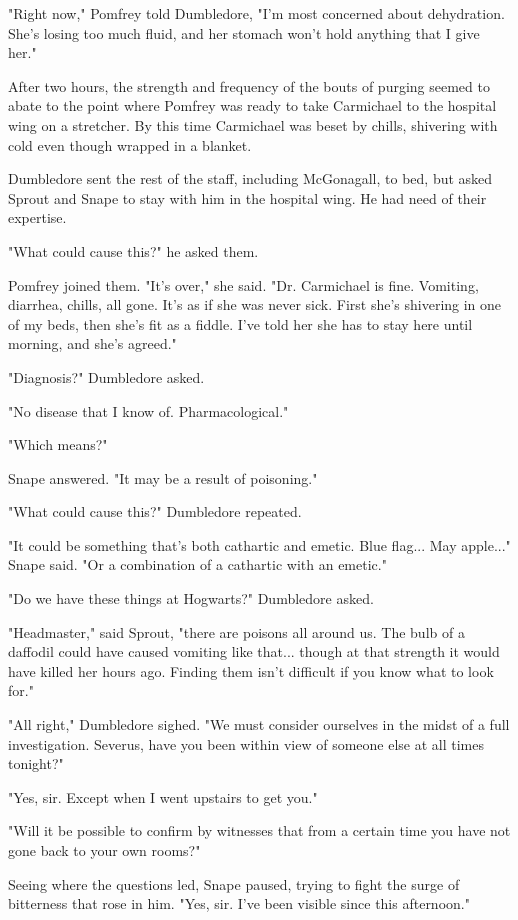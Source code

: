 \documentclass[a4paper,11pt]{article}
\begin{document}
"Right now," Pomfrey told Dumbledore, "I'm most concerned about dehydration. She's losing too much fluid, and her stomach won't hold anything that I give her."

After two hours, the strength and frequency of the bouts of purging seemed to abate to the point where Pomfrey was ready to take Carmichael to the hospital wing on a stretcher. By this time Carmichael was beset by chills, shivering with cold even though wrapped in a blanket.

Dumbledore sent the rest of the staff, including McGonagall, to bed, but asked Sprout and Snape to stay with him in the hospital wing. He had need of their expertise.

"What could cause this?" he asked them.

Pomfrey joined them. "It's over," she said. "Dr. Carmichael is fine. Vomiting, diarrhea, chills, all gone. It's as if she was never sick. First she's shivering in one of my beds, then she's fit as a fiddle. I've told her she has to stay here until morning, and she's agreed."

"Diagnosis?" Dumbledore asked.

"No disease that I know of. Pharmacological."

"Which means?"

Snape answered. "It may be a result of poisoning."

"What could cause this?" Dumbledore repeated.

"It could be something that's both cathartic and emetic. Blue flag... May apple..." Snape said. "Or a combination of a cathartic with an emetic."

"Do we have these things at Hogwarts?" Dumbledore asked.

"Headmaster," said Sprout, "there are poisons all around us. The bulb of a daffodil could have caused vomiting like that... though at that strength it would have killed her hours ago. Finding them isn't difficult if you know what to look for."

"All right," Dumbledore sighed. "We must consider ourselves in the midst of a full investigation. Severus, have you been within view of someone else at all times tonight?"

"Yes, sir. Except when I went upstairs to get you."

"Will it be possible to confirm by witnesses that from a certain time you have not gone back to your own rooms?"

Seeing where the questions led, Snape paused, trying to fight the surge of bitterness that rose in him. "Yes, sir. I've been visible since this afternoon."
\end{document}
